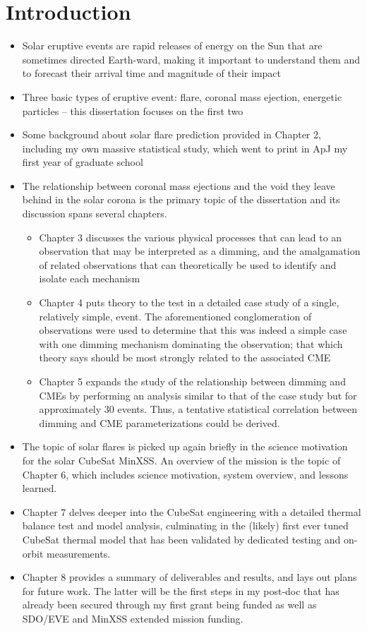 \chapter{Introduction}
\label{chapterintro}

\begin{itemize}
    \item{} Solar eruptive events are rapid releases of energy on the Sun that are sometimes directed Earth-ward, making it important to understand them and to forecast their arrival time and magnitude of their impact
    \item{} Three basic types of eruptive event: flare, coronal mass ejection, energetic particles – this dissertation focuses on the first two
    \item{} Some background about solar flare prediction provided in Chapter 2, including my own massive statistical study, which went to print in ApJ my first year of graduate school
    \item{} The relationship between coronal mass ejections and the void they leave behind in the solar corona is the primary topic of the dissertation and its discussion spans several chapters. 
    \begin{itemize}
        \item{} Chapter 3 discusses the various physical processes that can lead to an observation that may be interpreted as a dimming, and the amalgamation of related observations that can theoretically be used to identify and isolate each mechanism
        \item{} Chapter 4 puts theory to the test in a detailed case study of a single, relatively simple, event. The aforementioned conglomeration of observations were used to determine that this was indeed a simple case with one dimming mechanism dominating the observation; that which theory says should be most strongly related to the associated CME
        \item{} Chapter 5 expands the study of the relationship between dimming and CMEs by performing an analysis similar to that of the case study but for approximately 30 events. Thus, a tentative statistical correlation between dimming and CME parameterizations could be derived. 
    \end{itemize}
    \item{} The topic of solar flares is picked up again briefly in the science motivation for the solar CubeSat MinXSS. An overview of the mission is the topic of Chapter 6, which includes science motivation, system overview, and lessons learned. 
    \item{} Chapter 7 delves deeper into the CubeSat engineering with a detailed thermal balance test and model analysis, culminating in the (likely) first ever tuned CubeSat thermal model that has been validated by dedicated testing and on-orbit measurements. 
    \item{} Chapter 8 provides a summary of deliverables and results, and lays out plans for future work. The latter will be the first steps in my post-doc that has already been secured through my first grant being funded as well as SDO/EVE and MinXSS extended mission funding. 
\end{itemize}



